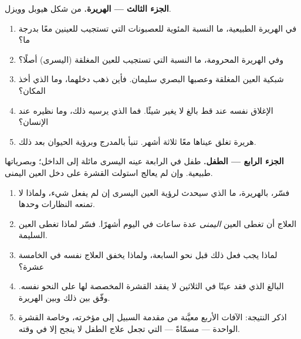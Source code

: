 \begin{problem}
\medskip
\noindent\textbf{الجزء الثالث --- الهريرة.}
من شكل هيوبل وويزل.
\begin{enumerate}[resume]
  \item في الهريرة الطبيعية، ما النسبة المئوية للعصبونات التي تستجيب
        للعينين معًا بدرجة ما؟
  \item وفي الهريرة المحرومة، ما النسبة التي تستجيب للعين المغلقة
        (اليسرى) أصلًا؟
  \item شبكية العين المغلقة وعصبها البصري سليمان. فأين ذهب دخلهما، وما
        الذي أخذ المكان؟
  \item الإغلاق نفسه عند قط بالغ لا يغير شيئًا. فما الذي يرسيه ذلك، وما
        نظيره عند الإنسان؟
  \item هريرة تغلق عيناها معًا ثلاثة أشهر. تنبأ بالمدرج وبرؤية الحيوان
        بعد ذلك.
\end{enumerate}

\medskip
\noindent\textbf{الجزء الرابع --- الطفل.}
طفل في الرابعة عينه اليسرى مائلة إلى الداخل؛ وبصرياتها طبيعية. وإن لم
يعالج استولت القشرة على دخل العين اليمنى.
\begin{enumerate}[resume]
  \item فسّر، بالهريرة، ما الذي سيحدث لرؤية العين اليسرى إن لم يفعل
        شيء، ولماذا لا تمنعه النظارات وحدها.
  \item العلاج أن تغطى العين \emph{اليمنى} عدة ساعات في اليوم أشهرًا.
        فسّر لماذا تغطى العين السليمة.
  \item لماذا يجب فعل ذلك قبل نحو السابعة، ولماذا يخفق العلاج نفسه في
        الخامسة عشرة؟
  \item البالغ الذي فقد عينًا في الثلاثين لا يفقد القشرة المخصصة لها
        على النحو نفسه. وفّق بين ذلك وبين الهريرة.
  \item اذكر النتيجة: الآفات الأربع معيَّنة من مقدمة السبيل إلى مؤخرته،
        وخاصة القشرة الواحدة --- مسمّاةً --- التي تجعل علاج الطفل لا
        ينجح إلا في وقته.
\end{enumerate}
\end{problem}
